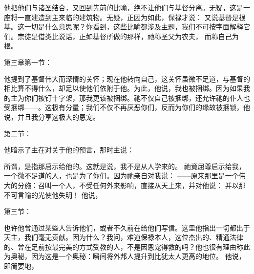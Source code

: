 他把他们与诸圣结合，又回到先前的比喻，绝不让他们与基督分离。无疑，这是一座将一直建造到主来临的建筑物。无疑，正因为如此，保禄才说： 又说基督是根基。这一切是什么意思呢？你看到，这些比喻都涉及主题，我们不可按字面解释它们。宗徒是借类比说话，正如基督所做的那样，祂称圣父为农夫， 而称自己为根。\par

第三章第一节：\par

他提到了基督伟大而深情的关怀；现在他转向自己，这关怀虽微不足道，与基督的相比算不得什么，却足以使他们依附于他。为此，他说，我也被捆绑。因为如果我的主为你们被钉十字架，那我更该被捆绑。祂不仅自己被捆绑，还允许祂的仆人也受捆绑——。这极有分量；我们不仅不再厌恶你们，反而为你们的缘故被捆锁，他说，并且我分享这极大的恩宠。\par

第二节：\par

他暗示了主在对关于他的预言，那时主说：\par

所谓，是指那启示给他的。这就是说，我不是从人学来的。 祂竟屈尊启示给我，一个微不足道的人，也是为了你们。因为祂亲自对我说： ——原来那里是一个伟大的分施：召叫一个人，不受任何外来影响，直接从天上来，并对他说： 并以那不可言喻的光使他失明！ 他说，\par

第三节：\par

也许他曾通过某些人告诉他们，或者不久前在给他们写信。这里他指出一切都出于天主，我们毫无贡献。因为什么？我问，难道保禄本人，这位杰出的、精通法律的、曾在足前按最完美的方式受教的人，不是因恩宠得救的吗？他也很有理由称此为奥秘，因为这是一个奥秘：瞬间将外邦人提升到比犹太人更高的地位。 他说， 即简要地，\par

